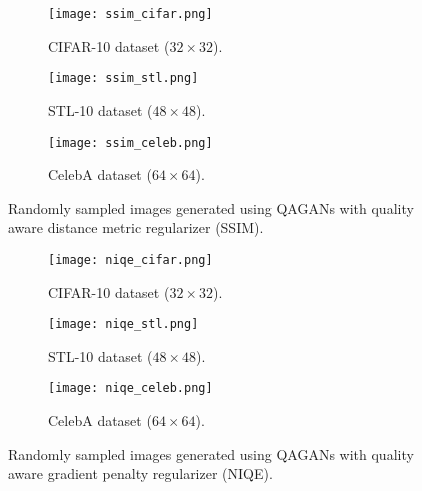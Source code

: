 \documentclass{article}
\begin{document}
\begin{figure*}[htbp]
\captionsetup[subfigure]{justification=centering}
\centering
\begin{subfigure}[b]{0.32\textwidth}
\texttt{[image: ssim\_cifar.png]}
\caption{CIFAR-10 dataset ($32\times 32$).}
\label{fig:ssim_cifar}
\end{subfigure}
\begin{subfigure}[b]{0.32\textwidth}
\texttt{[image: ssim\_stl.png]}
\caption{STL-10 dataset ($48\times 48$).}
\label{fig:ssim_stl}
\end{subfigure}
\begin{subfigure}[b]{0.32\textwidth}
\texttt{[image: ssim\_celeb.png]}
\caption{CelebA dataset ($64\times 64$).}
\label{fig:ssim_celeb}
\end{subfigure}

\caption{Randomly sampled images generated using QAGANs with quality aware distance metric regularizer (SSIM).}
\label{fig:ssim}
\end{figure*}

\begin{figure*}[htbp]
\captionsetup[subfigure]{justification=centering}
\centering
\vspace{-0.3cm}
\begin{subfigure}[b]{0.32\textwidth}
\texttt{[image: niqe\_cifar.png]}
\caption{CIFAR-10 dataset ($32\times 32$).}
\label{fig:niqe_cifar}
\end{subfigure}
\begin{subfigure}[b]{0.32\textwidth}
\texttt{[image: niqe\_stl.png]}
\caption{STL-10 dataset ($48\times 48$).}
\label{fig:niqe_stl}
\end{subfigure}
\begin{subfigure}[b]{0.32\textwidth}
\texttt{[image: niqe\_celeb.png]}
\caption{CelebA dataset ($64\times 64$).}
\label{fig:niqe_celeb}
\end{subfigure}
\caption{
{Randomly sampled images generated using QAGANs with quality aware gradient penalty regularizer (NIQE).}}
\label{fig:niqe}
\end{figure*}
\end{document}
